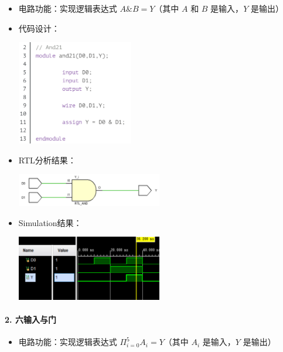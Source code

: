\documentclass[a4,10pt,zihao=-4]{ctexart}
\begin{document}
\begin{itemize}
\item
  电路功能：实现逻辑表达式 \(A \& B = Y \)（其中 \(A\) 和 \(B\)
  是输入，\(Y\) 是输出）
\item
  代码设计：
  
  \includegraphics[width=0.4\textwidth]{AND21_Code.png}
\item
  RTL分析结果：
  
  \includegraphics[width=0.5\textwidth]{AND21_RTL.png}
\item
  Simulation结果：
  
  \includegraphics[width=0.5\textwidth]{AND21_Simulation.png}
\end{itemize}

\paragraph{2. 六输入与门}
\begin{itemize}
\item
  电路功能：实现逻辑表达式 \(\Pi_{i=0}^{5} A_i = Y \)（其中 \(A_i\)
  是输入，\(Y\) 是输出）
\end{itemize}
\end{document}
